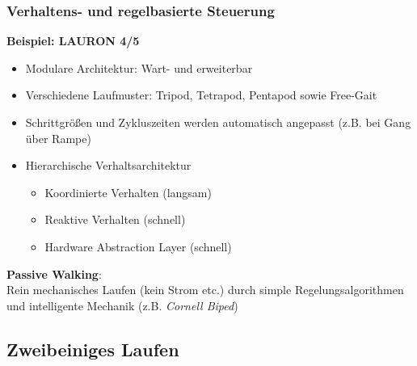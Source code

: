 \subsubsection{Verhaltens- und regelbasierte Steuerung}
\textbf{Beispiel: LAURON 4/5}
\begin{itemize}
\item Modulare Architektur: Wart- und erweiterbar
\item Verschiedene Laufmuster: Tripod, Tetrapod, Pentapod sowie Free-Gait
\item Schrittgrößen und Zykluszeiten werden automatisch angepasst (z.B. bei Gang über Rampe)
\item Hierarchische Verhaltsarchitektur
\begin{itemize}
\item Koordinierte Verhalten (langsam)
\item Reaktive Verhalten (schnell)
\item Hardware Abstraction Layer (schnell)
\end{itemize}
\end{itemize}
\textbf{Passive Walking}:\\
Rein mechanisches Laufen (kein Strom etc.) durch simple Regelungsalgorithmen und intelligente Mechanik (z.B. \textit{Cornell Biped})
\subsection{Zweibeiniges Laufen}
